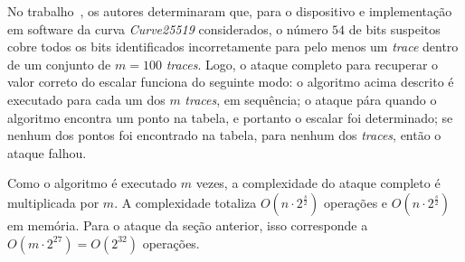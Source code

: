 \documentclass{SBCbookchapter}
\begin{document}
No trabalho~\cite{Nascimento2016_SAC}, os autores determinaram que, para o dispositivo e implementação em software da curva \emph{Curve25519} considerados, o número $54$ de bits suspeitos cobre todos os bits identificados incorretamente para pelo menos um \emph{trace} dentro de um conjunto de $m = 100$ \emph{traces}.
Logo, o ataque completo para recuperar o valor correto do escalar funciona do seguinte modo:
o algoritmo acima descrito é executado para cada um dos $m$ \emph{traces}, em sequência; o ataque pára quando o algoritmo encontra um ponto na tabela, e portanto o escalar foi determinado; se nenhum dos pontos foi encontrado na tabela, para nenhum dos \emph{traces}, então o ataque falhou.


Como o algoritmo é executado $m$ vezes, a complexidade do ataque completo é multiplicada por $m$. A complexidade totaliza $O(n \cdot 2^{\frac{s}{2}})$ operações e $O(n \cdot 2^{\frac{s}{2}})$ em memória.
Para o ataque da seção anterior, isso corresponde a $O\left(m \cdot 2^{27}\right) = O\left(2^{32}\right)$ operações.

\end{document}
